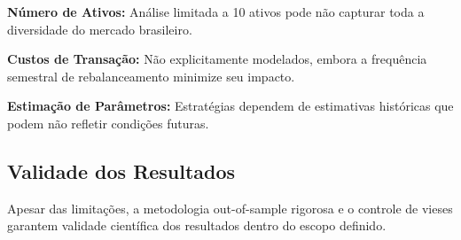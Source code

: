 \textbf{Número de Ativos:} Análise limitada a 10 ativos pode não capturar toda a diversidade do mercado brasileiro.

\textbf{Custos de Transação:} Não explicitamente modelados, embora a frequência semestral de rebalanceamento minimize seu impacto.

\textbf{Estimação de Parâmetros:} Estratégias dependem de estimativas históricas que podem não refletir condições futuras.

\subsection{Validade dos Resultados}

Apesar das limitações, a metodologia out-of-sample rigorosa e o controle de vieses garantem validade científica dos resultados dentro do escopo definido.